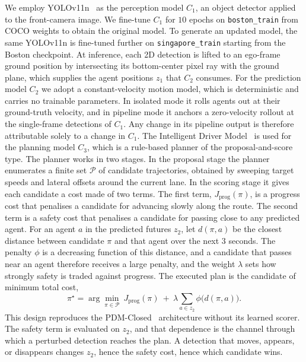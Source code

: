 \documentclass[conference]{IEEEtran}
\begin{document}
We employ YOLOv11n~\cite{jocher2024yolo11} as the perception model $C_1$, an
object detector applied to the front-camera image. We fine-tune $C_1$ for $10$
epochs on
\texttt{boston\_train} from COCO weights to obtain the original model. To generate
an updated model, the same YOLOv11n is fine-tuned further on
\texttt{singapore\_train} starting from the Boston checkpoint. At inference, each 2D detection is lifted to an
ego-frame ground position by intersecting its bottom-center pixel ray with the
ground plane, which supplies the agent positions $z_1$ that $C_2$ consumes. For the
prediction model $C_2$ we adopt a constant-velocity motion model, which is
deterministic and carries no trainable parameters. In isolated mode it rolls agents out at their ground-truth velocity, and
in pipeline mode it anchors a zero-velocity rollout at the single-frame detections
of $C_1$. Any change in its pipeline output is therefore attributable solely to a
change in $C_1$. The Intelligent Driver Model~\cite{treiber2000idm} is used for
the planning model $C_3$, which is a rule-based planner of the proposal-and-score
type. The planner works in two stages. In the proposal stage the planner enumerates a
finite set $\mathcal{P}$ of candidate trajectories, obtained by sweeping target speeds
and lateral offsets around the current lane. In the scoring stage it gives each
candidate a cost made of two terms. The first term, $J_{\text{prog}}(\pi)$, is a progress cost that
penalises a candidate for advancing slowly along the route. The second term is a
safety cost that penalises a candidate for passing close to any predicted agent. For
an agent $a$ in the predicted futures $z_2$, let $d(\pi,a)$ be the closest distance
between candidate $\pi$ and that agent over the next $3$ seconds. The penalty $\phi$ is a
decreasing function of this distance, and a candidate that passes near an agent
therefore receives a large penalty, and the weight $\lambda$ sets how strongly safety is traded
against progress. The executed plan is the candidate of minimum total cost,
\begin{equation}
\pi^{\star} = \arg\min_{\pi \in \mathcal{P}}\
J_{\text{prog}}(\pi)
\ +\ \lambda \!\!\sum_{a \in z_2} \phi\bigl(d(\pi, a)\bigr).
\label{eq:idm}
\end{equation}
This design reproduces the PDM-Closed~\cite{dauner2023parting} architecture without
its learned scorer. The safety term is evaluated on $z_2$, and that dependence is the
channel through which a perturbed detection reaches the plan. A detection that moves, appears, or
disappears changes $z_2$, hence the safety cost, hence which candidate wins.
\end{document}

